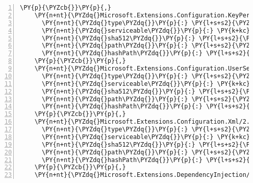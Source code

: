 \begin{Verbatim}[commandchars=\\\{\},numbers=left,firstnumber=1,stepnumber=1,numberblanklines=0]
    \PY{p}{\PYZcb{}}\PY{p}{,}
    \PY{n+nt}{\PYZdq{}Microsoft.Extensions.Configuration.KeyPerFile/2.1.0\PYZhy{}rc1\PYZhy{}final\PYZdq{}}\PY{p}{:} \PY{p}{\PYZob{}}
      \PY{n+nt}{\PYZdq{}type\PYZdq{}}\PY{p}{:} \PY{l+s+s2}{\PYZdq{}package\PYZdq{}}\PY{p}{,}
      \PY{n+nt}{\PYZdq{}serviceable\PYZdq{}}\PY{p}{:} \PY{k+kc}{true}\PY{p}{,}
      \PY{n+nt}{\PYZdq{}sha512\PYZdq{}}\PY{p}{:} \PY{l+s+s2}{\PYZdq{}sha512\PYZhy{}bpKfKezEuJD9RrtwMTy32GZGFNq5v8QeJ/S57SfmNJlyU3onoyEfOU4t4qxF7tDRe5Pso+npg9ZfvEFMWJwFAg==\PYZdq{}}\PY{p}{,}
      \PY{n+nt}{\PYZdq{}path\PYZdq{}}\PY{p}{:} \PY{l+s+s2}{\PYZdq{}microsoft.extensions.configuration.keyperfile/2.1.0\PYZhy{}rc1\PYZhy{}final\PYZdq{}}\PY{p}{,}
      \PY{n+nt}{\PYZdq{}hashPath\PYZdq{}}\PY{p}{:} \PY{l+s+s2}{\PYZdq{}microsoft.extensions.configuration.keyperfile.2.1.0\PYZhy{}rc1\PYZhy{}final.nupkg.sha512\PYZdq{}}
    \PY{p}{\PYZcb{}}\PY{p}{,}
    \PY{n+nt}{\PYZdq{}Microsoft.Extensions.Configuration.UserSecrets/2.1.0\PYZhy{}rc1\PYZhy{}final\PYZdq{}}\PY{p}{:} \PY{p}{\PYZob{}}
      \PY{n+nt}{\PYZdq{}type\PYZdq{}}\PY{p}{:} \PY{l+s+s2}{\PYZdq{}package\PYZdq{}}\PY{p}{,}
      \PY{n+nt}{\PYZdq{}serviceable\PYZdq{}}\PY{p}{:} \PY{k+kc}{true}\PY{p}{,}
      \PY{n+nt}{\PYZdq{}sha512\PYZdq{}}\PY{p}{:} \PY{l+s+s2}{\PYZdq{}sha512\PYZhy{}AkSOm5j6Pa5yKe0OFd1lU9XhpUqiNoJ82hY2BN88Bm/8Sjdga45aCtnh3/jv/zpzzmO+deGvhLc8KuwKAga2ig==\PYZdq{}}\PY{p}{,}
      \PY{n+nt}{\PYZdq{}path\PYZdq{}}\PY{p}{:} \PY{l+s+s2}{\PYZdq{}microsoft.extensions.configuration.usersecrets/2.1.0\PYZhy{}rc1\PYZhy{}final\PYZdq{}}\PY{p}{,}
      \PY{n+nt}{\PYZdq{}hashPath\PYZdq{}}\PY{p}{:} \PY{l+s+s2}{\PYZdq{}microsoft.extensions.configuration.usersecrets.2.1.0\PYZhy{}rc1\PYZhy{}final.nupkg.sha512\PYZdq{}}
    \PY{p}{\PYZcb{}}\PY{p}{,}
    \PY{n+nt}{\PYZdq{}Microsoft.Extensions.Configuration.Xml/2.1.0\PYZhy{}rc1\PYZhy{}final\PYZdq{}}\PY{p}{:} \PY{p}{\PYZob{}}
      \PY{n+nt}{\PYZdq{}type\PYZdq{}}\PY{p}{:} \PY{l+s+s2}{\PYZdq{}package\PYZdq{}}\PY{p}{,}
      \PY{n+nt}{\PYZdq{}serviceable\PYZdq{}}\PY{p}{:} \PY{k+kc}{true}\PY{p}{,}
      \PY{n+nt}{\PYZdq{}sha512\PYZdq{}}\PY{p}{:} \PY{l+s+s2}{\PYZdq{}sha512\PYZhy{}GBwrFyffxKPIcdQyY658/kM7JHVukJ6NZxstk2Hsn0VLtSv9VOhBzvUkowxrtWK7lPKwKBSA7rndk8c2hcTALg==\PYZdq{}}\PY{p}{,}
      \PY{n+nt}{\PYZdq{}path\PYZdq{}}\PY{p}{:} \PY{l+s+s2}{\PYZdq{}microsoft.extensions.configuration.xml/2.1.0\PYZhy{}rc1\PYZhy{}final\PYZdq{}}\PY{p}{,}
      \PY{n+nt}{\PYZdq{}hashPath\PYZdq{}}\PY{p}{:} \PY{l+s+s2}{\PYZdq{}microsoft.extensions.configuration.xml.2.1.0\PYZhy{}rc1\PYZhy{}final.nupkg.sha512\PYZdq{}}
    \PY{p}{\PYZcb{}}\PY{p}{,}
    \PY{n+nt}{\PYZdq{}Microsoft.Extensions.DependencyInjection/2.1.0\PYZhy{}rc1\PYZhy{}final\PYZdq{}}\PY{p}{:} \PY{p}{\PYZob{}}

\end{Verbatim}
